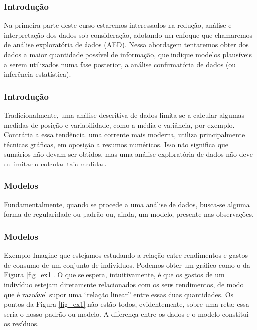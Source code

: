 \documentclass[14pt,aspectratio=1610]{beamer}
\begin{document}
\begin{frame}{}
\frametitle{Introdução}
\begin{block}{}
\justifying
Na primeira parte deste curso estaremos interessados na redução, análise e interpretação dos dados sob consideração, adotando um enfoque que chamaremos de análise
exploratória de dados (AED). Nessa abordagem tentaremos obter dos dados a maior
quantidade possível de informação, que indique modelos plausíveis a serem utilizados
numa fase posterior, a análise confirmatória de dados (ou inferência estatística).
\end{block}
\end{frame}

\begin{frame}{}
\frametitle{Introdução}
\begin{block}{}
\justifying
Tradicionalmente, uma análise descritiva de dados limita-se a calcular algumas
medidas de posição e variabilidade, como a média e variância, por exemplo. Contrária
a essa tendência, uma corrente mais moderna, utiliza principalmente técnicas gráficas, em oposição a resumos numéricos. Isso não significa que sumários não devam ser obtidos, mas uma análise exploratória de dados não deve se limitar a calcular tais medidas.
\end{block}
\end{frame}

\begin{frame}{}
\frametitle{Modelos}
\begin{block}{}
\justifying
Fundamentalmente, quando se procede a uma análise de dados, busca-se alguma
forma de regularidade ou padrão ou, ainda, um modelo, presente nas observações.
\end{block}
\end{frame}

\begin{frame}{}
\frametitle{Modelos}
\begin{block}{Exemplo}
\justifying
Imagine que estejamos estudando a relação entre rendimentos e gastos
de consumo de um conjunto de indivíduos. Podemos obter um gráfico como o da
Figura \ref{fig_ex1}. O que se espera, intuitivamente, é que os gastos de um indivíduo estejam diretamente relacionados com os seus rendimentos, de modo que é razoável supor uma “relação linear” entre essas duas quantidades. Os pontos da Figura \ref{fig_ex1} não estão todos, evidentemente, sobre uma reta; essa seria o nosso padrão ou modelo. A diferença entre os dados e o modelo constitui os resíduos.
\end{block}
\end{frame}
\end{document}
